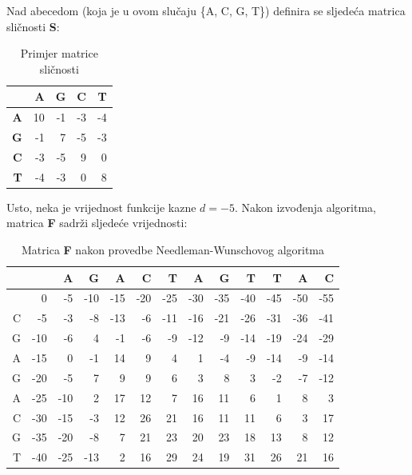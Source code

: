 \documentclass[times, utf8, zavrsni, numeric]{fer}
\begin{document}
Nad abecedom (koja je u ovom slučaju \{A, C, G, T\}) definira se sljedeća matrica sličnosti \textbf{S}:
\begin{table}[hb]
\begin{center}
\begin{tabular}{r | r r r r}
 & \textbf{A} & \textbf{G} & \textbf{C} & \textbf{T} \\
\hline
\textbf{A} & 10 & -1 & -3 & -4\\
\textbf{G} & -1 & 7 & -5 & -3\\
\textbf{C} & -3 & -5 & 9 & 0\\
\textbf{T} & -4 & -3 & 0 & 8\\
\end{tabular}
\end{center}
\caption{Primjer matrice sličnosti}
\label{table:matricaslicnosti}
\end{table}
Usto, neka je vrijednost funkcije kazne $d = -5$. Nakon izvođenja algoritma, matrica \textbf{F} sadrži sljedeće vrijednosti:
\begin{table}[h]
\begin{center}
\begin{tabular}{| r | r r r r r r r r r r r r |}
\hline
 &  & A & G & A & C & T & A & G & T & T & A & C \\
\hline
 & \cellcolor{lightgray}0 & -5 & -10 & -15 & -20 & -25 & -30 & -35 & -40 & -45 & -50 & -55\\
C & -5 & \cellcolor{lightgray}-3 & -8 & -13 & -6 & -11 & -16 & -21 & -26 & -31 & -36 & -41\\
G & -10 & -6 & \cellcolor{lightgray}4 & -1 & -6 & -9 & -12 & -9 & -14 & -19 & -24 & -29\\
A & -15 & 0 & -1 & \cellcolor{lightgray}14 & 9 & 4 & 1 & -4 & -9 & -14 & -9 & -14\\
G & -20 & -5 & 7 & \cellcolor{lightgray}9 & 9 & 6 & 3 & 8 & 3 & -2 & -7 & -12\\
A & -25 & -10 & 2 & \cellcolor{lightgray}17 & 12 & 7 & 16 & 11 & 6 & 1 & 8 & 3 \\
C & -30 & -15 & -3 & 12 & \cellcolor{lightgray}26 & 21 & 16 & 11 & 11 & 6 & 3 & 17 \\
G & -35 & -20 & -8 & 7 & 21 & \cellcolor{lightgray}23 & \cellcolor{lightgray}20 & \cellcolor{lightgray}23 & 18 & 13 & 8 & 12 \\
T & -40 & -25 & -13 & 2 & 16 & 29 & 24 & 19 & \cellcolor{lightgray}31 & \cellcolor{lightgray}26 & \cellcolor{lightgray}21 & \cellcolor{lightgray}16 \\
\hline
\end{tabular}
\end{center}
\caption{Matrica \textbf{F} nakon provedbe Needleman-Wunschovog algoritma}
\label{table:nwmatrica}
\end{table}
\end{document}
